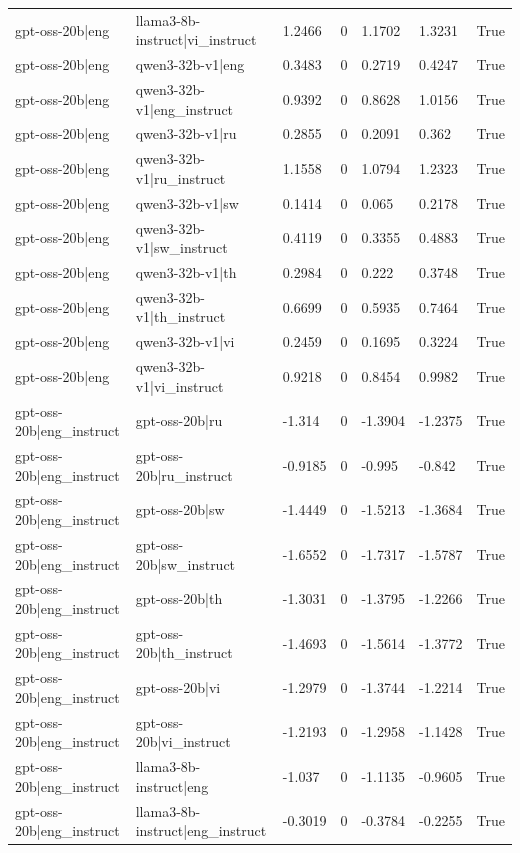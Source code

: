 \begin{table}
\begin{tabular}{llllllr}
gpt-oss-20b|eng & llama3-8b-instruct|vi_instruct & 1.2466 & 0 & 1.1702 & 1.3231 & True \\
gpt-oss-20b|eng & qwen3-32b-v1|eng & 0.3483 & 0 & 0.2719 & 0.4247 & True \\
gpt-oss-20b|eng & qwen3-32b-v1|eng_instruct & 0.9392 & 0 & 0.8628 & 1.0156 & True \\
gpt-oss-20b|eng & qwen3-32b-v1|ru & 0.2855 & 0 & 0.2091 & 0.362 & True \\
gpt-oss-20b|eng & qwen3-32b-v1|ru_instruct & 1.1558 & 0 & 1.0794 & 1.2323 & True \\
gpt-oss-20b|eng & qwen3-32b-v1|sw & 0.1414 & 0 & 0.065 & 0.2178 & True \\
gpt-oss-20b|eng & qwen3-32b-v1|sw_instruct & 0.4119 & 0 & 0.3355 & 0.4883 & True \\
gpt-oss-20b|eng & qwen3-32b-v1|th & 0.2984 & 0 & 0.222 & 0.3748 & True \\
gpt-oss-20b|eng & qwen3-32b-v1|th_instruct & 0.6699 & 0 & 0.5935 & 0.7464 & True \\
gpt-oss-20b|eng & qwen3-32b-v1|vi & 0.2459 & 0 & 0.1695 & 0.3224 & True \\
gpt-oss-20b|eng & qwen3-32b-v1|vi_instruct & 0.9218 & 0 & 0.8454 & 0.9982 & True \\
gpt-oss-20b|eng_instruct & gpt-oss-20b|ru & -1.314 & 0 & -1.3904 & -1.2375 & True \\
gpt-oss-20b|eng_instruct & gpt-oss-20b|ru_instruct & -0.9185 & 0 & -0.995 & -0.842 & True \\
gpt-oss-20b|eng_instruct & gpt-oss-20b|sw & -1.4449 & 0 & -1.5213 & -1.3684 & True \\
gpt-oss-20b|eng_instruct & gpt-oss-20b|sw_instruct & -1.6552 & 0 & -1.7317 & -1.5787 & True \\
gpt-oss-20b|eng_instruct & gpt-oss-20b|th & -1.3031 & 0 & -1.3795 & -1.2266 & True \\
gpt-oss-20b|eng_instruct & gpt-oss-20b|th_instruct & -1.4693 & 0 & -1.5614 & -1.3772 & True \\
gpt-oss-20b|eng_instruct & gpt-oss-20b|vi & -1.2979 & 0 & -1.3744 & -1.2214 & True \\
gpt-oss-20b|eng_instruct & gpt-oss-20b|vi_instruct & -1.2193 & 0 & -1.2958 & -1.1428 & True \\
gpt-oss-20b|eng_instruct & llama3-8b-instruct|eng & -1.037 & 0 & -1.1135 & -0.9605 & True \\
gpt-oss-20b|eng_instruct & llama3-8b-instruct|eng_instruct & -0.3019 & 0 & -0.3784 & -0.2255 & True \\

\end{tabular}
\end{table}
